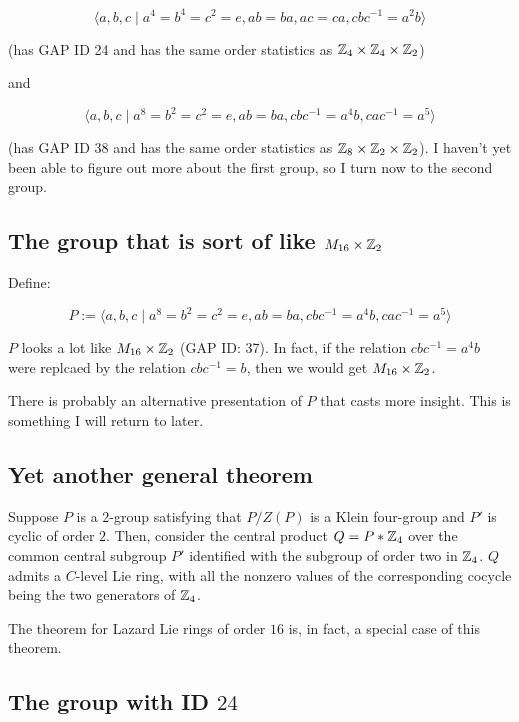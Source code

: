 \documentclass[10pt]{amsart}
\begin{document}
$$\langle a,b,c \mid a^4 = b^4 = c^2 = e, ab = ba, ac = ca, cbc^{-1} = a^2b \rangle$$

(has GAP ID 24 and has the same order statistics as $\mathbb{Z}_4 \times \mathbb{Z}_4
\times \mathbb{Z}_2$)

and

$$\langle a,b,c \mid a^8 = b^2 = c^2 = e, ab = ba, cbc^{-1} = a^4b, cac^{-1} = a^5 \rangle$$

(has GAP ID 38 and has the same order statistics as $\mathbb{Z}_8 \times \mathbb{Z}_2
\times \mathbb{Z}_2$). I haven't yet been able to figure out more about the
first group, so I turn now to the second group.

\subsection{The group that is sort of like $M_{16} \times \mathbb{Z}_2$}

Define:

$$P := \langle a,b,c \mid a^8 = b^2 = c^2 = e, ab = ba, cbc^{-1} = a^4b, cac^{-1} = a^5 \rangle$$

$P$ looks a lot like $M_{16} \times \mathbb{Z}_2$ (GAP ID: 37). In fact, if
the relation $cbc^{-1} = a^4b$ were replcaed by the relation $cbc^{-1}
= b$, then we would get $M_{16} \times \mathbb{Z}_2$.

There is probably an alternative presentation of $P$ that casts more
insight. This is something I will return to later.

\subsection{Yet another general theorem}

\begin{theorem}\label{centralproductZ4embedding}
  Suppose $P$ is a $2$-group satisfying that $P/Z(P)$ is a Klein
  four-group and $P'$ is cyclic of order $2$. Then, consider the
  central product $Q = P * \mathbb{Z}_4$ over the common central subgroup $P'$
  identified with the subgroup of order two in $\mathbb{Z}_4$. $Q$ admits a
  $C$-level Lie ring, with all the nonzero values of the corresponding
  cocycle being the two generators of $\mathbb{Z}_4$.
\end{theorem}

The theorem for Lazard Lie rings of order $16$ is, in fact, a special
case of this theorem.

\subsection{The group with ID $24$}
\end{document}
